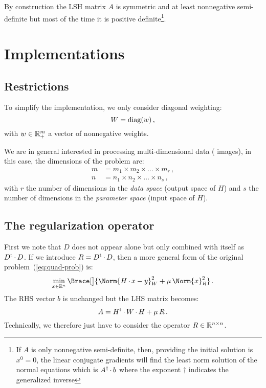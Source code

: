 \documentclass[9pt,a4paper,twocolumn]{article}
\renewcommand*{\cdot}{\mathord{\,\mathchar"2201\,}}
\begin{document}
By construction the LSH matrix $A$ is symmetric and at least nonnegative
semi-definite but most of the time it is positive definite\footnote{If $A$ is only nonnegative
semi-definite, then, providing the initial solution is $x^{0} = 0$, the linear conjugate gradients will find the least norm solution of the normal equations which is $A^{\dagger}\cdot b$ where the exponent $\dagger$ indicates the generalized inverse}.



\section{Implementations}

\subsection{Restrictions}

To simplify the implementation, we only consider diagonal weighting:
\begin{equation}
  W = \operatorname{diag}(w) \, ,
\end{equation}
with $w \in \mathbb{R}^{m}_+$ a vector of nonnegative weights.

We are in general interested in processing multi-dimensional data (\eg
images), in this case, the dimensions of the problem are:
\begin{align}
  m &= m_1 \times m_2 \times \ldots \times m_r \, , \\
  n &= n_1 \times n_2 \times \ldots \times n_s \, ,
\end{align}
with $r$ the number of dimensions in the \emph{data space} (output space of
$H$) and $s$ the number of dimensions in the \emph{parameter space} (input
space of $H$).


\subsection{The regularization operator}

First we note that $D$ does not appear alone but only combined with itself as
$D\T \cdot D$.  If we introduce $R = D\T \cdot D$, then a more general form of
the original problem~(\ref{eq:quad-prob}) is:
\begin{equation}
  \min_{x \in \Reals^{n}} \Brace[\big]{
    \Norm{H \cdot x - y}_{W}^2 + \mu \, \Norm{x}_{R}^2
  } \, .
  \label{eq:gen-quad-prob}
\end{equation}
The RHS vector $b$ is unchanged but the LHS matrix becomes:
\begin{equation}
  A =  H\T \cdot W \cdot H + \mu \, R \, . 
  \label{eq:gen-lhs-matrix}
\end{equation}
Technically, we therefore just have to consider the operator $R \in \mathbb{R}^{n
\times n}$.
\end{document}

